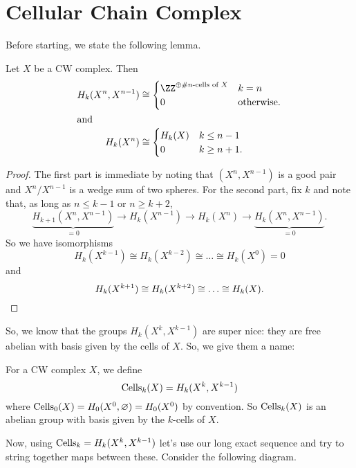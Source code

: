 \section{Cellular Chain Complex}
Before starting, we state the following lemma.
\begin{lemma}
	Let $X$ be a CW complex. Then
	\begin{align*}
		H_k(X^n, X^{n-1}) &\cong
		\begin{cases}
			\ZZ^{\oplus\text{\#$n$-cells of $X$}} & k = n \\
			0 & \text{otherwise}.
		\end{cases} \\
		\intertext{and}
		H_k(X^n) &\cong
		\begin{cases}
			H_k(X) & k \le n-1 \\
			0 & k \ge n+1.
		\end{cases}
	\end{align*}
\end{lemma}
\begin{proof}
	The first part is immediate by noting that $(X^n, X^{n-1})$ is a good pair
	and $X^n/X^{n-1}$ is a wedge sum of two spheres.
	For the second part, fix $k$ and note that, as long as $n \le k-1$ or $n \ge k+2$,
	\[
		\underbrace{H_{k+1}(X^n, X^{n-1})}_{=0}
		\to H_k(X^{n-1})
		\to H_k(X^n)
		\to \underbrace{H_{k}(X^n, X^{n-1})}_{=0}.
	\]
	So we have isomorphisms
	\[ H_k(X^{k-1}) \cong H_k(X^{k-2}) \cong \dots \cong H_k(X^0) = 0 \]
	and
	\[ H_k(X^{k+1}) \cong H_k(X^{k+2}) \cong \dots \cong H_k(X). \qedhere \]
\end{proof}

So, we know that the groups $H_k(X^k, X^{k-1})$ are super nice:
they are free abelian with basis given by the cells of $X$.
So, we give them a name:
\begin{definition}
	For a CW complex $X$, we define
	\[ \operatorname{Cells}_k(X) = H_k(X^k, X^{k-1}) \]
	where $\operatorname{Cells}_0(X) = H_0(X^0, \varnothing) = H_0(X^0)$ by convention.
	So $\operatorname{Cells}_k(X)$ is an abelian group with basis given by
	the $k$-cells of $X$.
\end{definition}

Now, using $\operatorname{Cells}_k = H_k(X^k, X^{k-1})$ let's use
our long exact sequence and try to string together maps between these.
Consider the following diagram.

